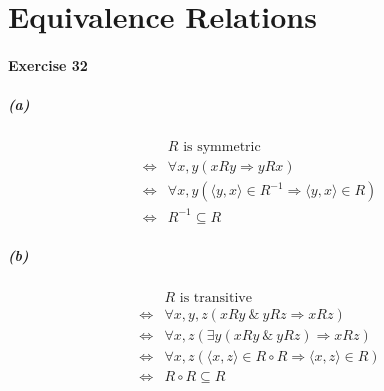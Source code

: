 \documentclass{report}
\begin{document}
    \section{Equivalence Relations}

    \paragraph{Exercise 32}
    \subparagraph{(a)}
    \begin{align*}
        & \text{$R$ is symmetric} \\
        \Leftrightarrow & \forall x,y(xRy \Rightarrow yRx) \\
        \Leftrightarrow & \forall x,y(\langle y,x \rangle \in R^{-1} \Rightarrow \langle y,x \rangle \in R) \\
        \Leftrightarrow & R^{-1} \subseteq R
    \end{align*}

    \subparagraph{(b)}
    \begin{align*}
        & \text{$R$ is transitive} \\
        \Leftrightarrow & \forall x,y,z(xRy \ \&\ yRz \Rightarrow xRz) \\
        \Leftrightarrow & \forall x,z(\exists y(xRy\ \&\ yRz) \Rightarrow xRz) \\
        \Leftrightarrow & \forall x,z(\langle x,z \rangle \in R \circ R \Rightarrow \langle x,z \rangle \in R) \\
        \Leftrightarrow & R \circ R \subseteq R
    \end{align*}
\end{document}
